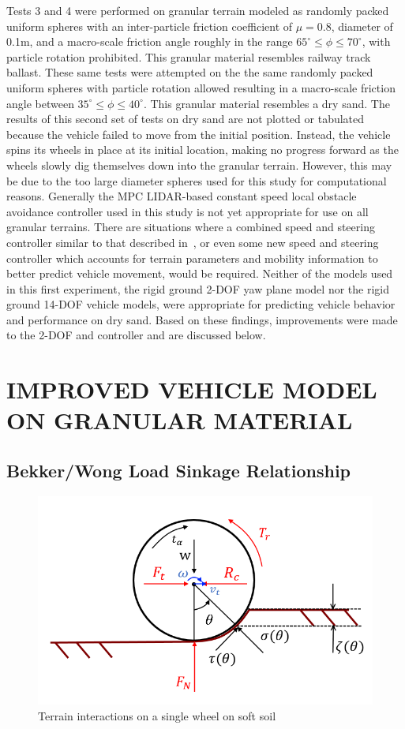 \documentclass[12pt,onecolumn]{report}
\begin{document}
Tests 3 and 4 were performed on granular terrain modeled as randomly packed uniform spheres with an inter-particle friction coefficient of $\mu = 0.8$, diameter of 0.1m, and a macro-scale friction angle roughly in the range $65^\circ \leq \phi \leq 70^\circ$, with particle rotation prohibited. This granular material resembles railway track ballast. These same tests were attempted on the the same randomly packed uniform spheres with particle rotation allowed resulting in a macro-scale friction angle between $35^\circ \leq \phi \leq 40^\circ$. This granular material resembles a dry sand. The results of this second set of tests on dry sand are not plotted or tabulated because the vehicle failed to move from the initial position. Instead, the vehicle spins its wheels in place at its initial location, making no progress forward as the wheels slowly dig themselves down into the granular terrain. However, this may be due to the too large diameter spheres used for this study for computational reasons. Generally the MPC LIDAR-based constant speed local obstacle avoidance controller used in this study is not yet appropriate for use on all granular terrains. There are situations where a combined speed and steering controller similar to that described in~\cite{SpeedSteer2015}, or even some new speed and steering controller which accounts for terrain parameters and mobility information to better predict vehicle movement, would be required. Neither of the models used in this first experiment, the rigid ground 2-DOF yaw plane model nor the rigid ground 14-DOF vehicle models, were appropriate for predicting vehicle behavior and performance on dry sand. Based on these findings, improvements were made to the 2-DOF and controller and are discussed below.


\chapter{IMPROVED VEHICLE MODEL ON GRANULAR MATERIAL}\label{c:improvedModel}
\section{Bekker/Wong Load Sinkage Relationship}\label{s:BekkerWong}

\begin{figure}
	\centering
	\includegraphics[width=0.8\columnwidth]{Figs/tireRolling.png}
	\caption{\small Terrain interactions on a single wheel on soft soil}  
	\label{fig:wheelTerrain}
\end{figure}
\end{document}
